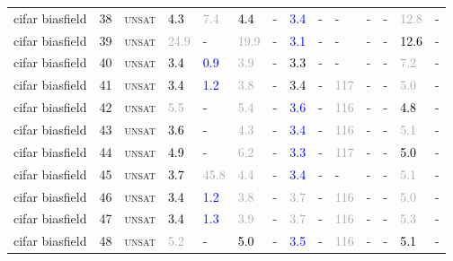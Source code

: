 \begin{center}
{\begin{longtable}{@{}llllllllllllll@{}}
cifar biasfield & 38 & \textsc{unsat} & \textcolor{black}{4.3} & \textcolor{darkgray}{7.4} & \textcolor{black}{4.4} & - & \textcolor{blue}{3.4} & - & - & - & - & \textcolor{darkgray}{12.8} & - \\
cifar biasfield & 39 & \textsc{unsat} & \textcolor{darkgray}{24.9} & - & \textcolor{darkgray}{19.9} & - & \textcolor{blue}{3.1} & - & - & - & - & \textcolor{black}{12.6} & - \\
cifar biasfield & 40 & \textsc{unsat} & \textcolor{black}{3.4} & \textcolor{blue}{0.9} & \textcolor{darkgray}{3.9} & - & \textcolor{black}{3.3} & - & - & - & - & \textcolor{darkgray}{7.2} & - \\
cifar biasfield & 41 & \textsc{unsat} & \textcolor{black}{3.4} & \textcolor{blue}{1.2} & \textcolor{darkgray}{3.8} & - & \textcolor{black}{3.4} & - & \textcolor{darkgray}{117} & - & - & \textcolor{darkgray}{5.0} & - \\
cifar biasfield & 42 & \textsc{unsat} & \textcolor{darkgray}{5.5} & - & \textcolor{darkgray}{5.4} & - & \textcolor{blue}{3.6} & - & \textcolor{darkgray}{116} & - & - & \textcolor{black}{4.8} & - \\
cifar biasfield & 43 & \textsc{unsat} & \textcolor{black}{3.6} & - & \textcolor{darkgray}{4.3} & - & \textcolor{blue}{3.4} & - & \textcolor{darkgray}{116} & - & - & \textcolor{darkgray}{5.1} & - \\
cifar biasfield & 44 & \textsc{unsat} & \textcolor{black}{4.9} & - & \textcolor{darkgray}{6.2} & - & \textcolor{blue}{3.3} & - & \textcolor{darkgray}{117} & - & - & \textcolor{black}{5.0} & - \\
cifar biasfield & 45 & \textsc{unsat} & \textcolor{black}{3.7} & \textcolor{darkgray}{45.8} & \textcolor{darkgray}{4.4} & - & \textcolor{blue}{3.4} & - & - & - & - & \textcolor{darkgray}{5.1} & - \\
cifar biasfield & 46 & \textsc{unsat} & \textcolor{black}{3.4} & \textcolor{blue}{1.2} & \textcolor{darkgray}{3.8} & - & \textcolor{darkgray}{3.7} & - & \textcolor{darkgray}{116} & - & - & \textcolor{darkgray}{5.0} & - \\
cifar biasfield & 47 & \textsc{unsat} & \textcolor{black}{3.4} & \textcolor{blue}{1.3} & \textcolor{darkgray}{3.9} & - & \textcolor{darkgray}{3.7} & - & \textcolor{darkgray}{116} & - & - & \textcolor{darkgray}{5.3} & - \\
cifar biasfield & 48 & \textsc{unsat} & \textcolor{darkgray}{5.2} & - & \textcolor{black}{5.0} & - & \textcolor{blue}{3.5} & - & \textcolor{darkgray}{116} & - & - & \textcolor{black}{5.1} & - \\

\end{longtable}}
\end{center}
